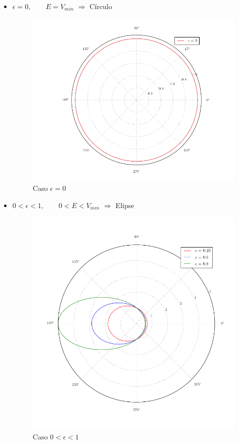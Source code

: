\documentclass[a4paper,10pt]{article}
\numberwithin{equation}{section}
\begin{document}
\begin{itemize}
 \item $\epsilon = 0, \qquad E=V_{min}$ $\Rightarrow$ Círculo

\begin{figure}[H]
 \center 
 \includegraphics[scale=0.4]{problema5fig3}
 \caption{Caso $\epsilon = 0$}
 \label{fig:circulo}
\end{figure}

\newpage

 \item $0 < \epsilon < 1, \qquad  0 < E < V_{min}$ $\Rightarrow$ Elipse

\begin{figure}[H]
 \center 
 \includegraphics[scale=0.45]{problema5fig4}
 \caption{Caso $0 < \epsilon < 1$}
 \label{fig:elipse}
\end{figure}

\end{itemize}
\end{document}
